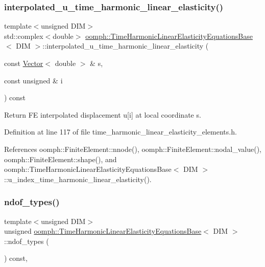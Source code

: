 \subsubsection{\texorpdfstring{interpolated\+\_\+u\+\_\+time\+\_\+harmonic\+\_\+linear\+\_\+elasticity()}{interpolated\_u\_time\_harmonic\_linear\_elasticity()}\hspace{0.1cm}{\footnotesize\ttfamily [2/2]}}
{\footnotesize\ttfamily template$<$unsigned D\+IM$>$ \\
std\+::complex$<$double$>$ \hyperlink{classoomph_1_1TimeHarmonicLinearElasticityEquationsBase}{oomph\+::\+Time\+Harmonic\+Linear\+Elasticity\+Equations\+Base}$<$ D\+IM $>$\+::interpolated\+\_\+u\+\_\+time\+\_\+harmonic\+\_\+linear\+\_\+elasticity (\begin{DoxyParamCaption}\item[{const \hyperlink{classoomph_1_1Vector}{Vector}$<$ double $>$ \&}]{s,  }\item[{const unsigned \&}]{i }\end{DoxyParamCaption}) const\hspace{0.3cm}{\ttfamily [inline]}}



Return FE interpolated displacement u\mbox{[}i\mbox{]} at local coordinate s. 



Definition at line 117 of file time\+\_\+harmonic\+\_\+linear\+\_\+elasticity\+\_\+elements.\+h.



References oomph\+::\+Finite\+Element\+::nnode(), oomph\+::\+Finite\+Element\+::nodal\+\_\+value(), oomph\+::\+Finite\+Element\+::shape(), and oomph\+::\+Time\+Harmonic\+Linear\+Elasticity\+Equations\+Base$<$ D\+I\+M $>$\+::u\+\_\+index\+\_\+time\+\_\+harmonic\+\_\+linear\+\_\+elasticity().

\mbox{\label{classoomph_1_1TimeHarmonicLinearElasticityEquationsBase_a8008c586eb05403bef38a8d2fe421417}} 
\subsubsection{\texorpdfstring{ndof\+\_\+types()}{ndof\_types()}}
{\footnotesize\ttfamily template$<$unsigned D\+IM$>$ \\
unsigned \hyperlink{classoomph_1_1TimeHarmonicLinearElasticityEquationsBase}{oomph\+::\+Time\+Harmonic\+Linear\+Elasticity\+Equations\+Base}$<$ D\+IM $>$\+::ndof\+\_\+types (\begin{DoxyParamCaption}{ }\end{DoxyParamCaption}) const\hspace{0.3cm}{\ttfamily [inline]}, {\ttfamily [virtual]}}



